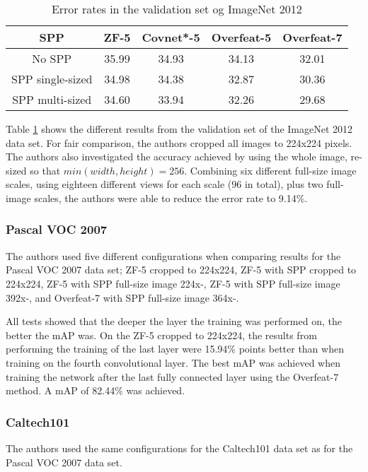 \begin{table}
    \centering
    \begin{tabular}{| c | c | c | c | c |}
        \hline
        \textbf{SPP} & \textbf{ZF-5} & \textbf{Covnet*-5} & \textbf{Overfeat-5} & \textbf{Overfeat-7} \\\hline
        No SPP              & 35.99 & 34.93 & 34.13 & 32.01 \\\hline
        SPP single-sized    & 34.98 & 34.38 & 32.87 & 30.36 \\\hline
        SPP multi-sized     & 34.60 & 33.94 & 32.26 & 29.68 \\\hline
    \end{tabular}
    \caption{Error rates in the validation set og ImageNet 2012}
    \label{tab:ImageNet2012}
\end{table}

Table \ref{tab:ImageNet2012} shows the different results from the validation set of the ImageNet 2012 data set. For fair comparison, the authors cropped all images to 224x224 pixels. The authors also investigated the accuracy achieved by using the whole image, re-sized so that $min(width, height) = 256$. Combining six different full-size image scales, using eighteen different views for each scale (96 in total), plus two full-image scales, the authors were able to reduce the error rate to 9.14\%.

\subsubsection{Pascal VOC 2007}
The authors used five different configurations when comparing results for the Pascal VOC 2007 data set; ZF-5 cropped to 224x224, ZF-5 with SPP cropped to 224x224, ZF-5 with SPP full-size image 224x-, ZF-5 with SPP full-size image 392x-, and Overfeat-7 with SPP full-size image 364x-.

All tests showed that the deeper the layer the training was performed on, the better the mAP was. On the ZF-5 cropped to 224x224, the results from performing the training of the last layer were 15.94\% points better than when training on the fourth convolutional layer. The best mAP was achieved when training the network after the last fully connected layer using the Overfeat-7 method. A mAP of 82.44\% was achieved.

\subsubsection{Caltech101}
The authors used the same configurations for the Caltech101 data set as for the Pascal VOC 2007 data set.

